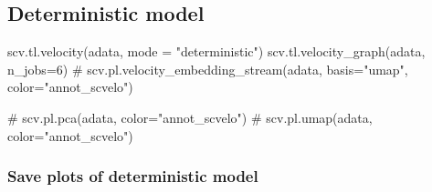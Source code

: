\documentclass[
  letterpaper,
  DIV=11,
  numbers=noendperiod]{scrreprt}
\newenvironment{Shaded}{\begin{snugshade}}{\end{snugshade}}
\newcommand{\CommentTok}[1]{\textcolor[rgb]{0.37,0.37,0.37}{#1}}
\newcommand{\DecValTok}[1]{\textcolor[rgb]{0.68,0.00,0.00}{#1}}
\newcommand{\NormalTok}[1]{\textcolor[rgb]{0.00,0.23,0.31}{#1}}
\newcommand{\OperatorTok}[1]{\textcolor[rgb]{0.37,0.37,0.37}{#1}}
\newcommand{\StringTok}[1]{\textcolor[rgb]{0.13,0.47,0.30}{#1}}
\begin{document}
\subsection{Deterministic model}\label{deterministic-model}

\begin{Shaded}
\begin{Highlighting}[]
\NormalTok{scv.tl.velocity(adata, mode }\OperatorTok{=} \StringTok{"deterministic"}\NormalTok{)}
\NormalTok{scv.tl.velocity\_graph(adata, n\_jobs}\OperatorTok{=}\DecValTok{6}\NormalTok{)}
\CommentTok{\# scv.pl.velocity\_embedding\_stream(adata, basis="umap", color="annot\_scvelo")}

\CommentTok{\# scv.pl.pca(adata, color="annot\_scvelo")}
\CommentTok{\# scv.pl.umap(adata, color="annot\_scvelo")}
\end{Highlighting}
\end{Shaded}

\subsubsection{Save plots of deterministic
model}\label{save-plots-of-deterministic-model}
\end{document}
